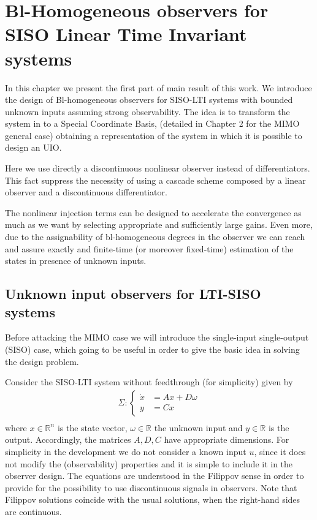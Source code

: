\documentclass[11pt,letterpaper,twoside,openright]{report}
\newcommand{\RE}{\mathbb{R}}
\begin{document}
	\chapter{Bl-Homogeneous observers for SISO Linear Time Invariant systems}
In this chapter we present the first part of main result of this work. We introduce the design of Bl-homogeneous observers for SISO-LTI systems with bounded unknown inputs assuming strong observability. The idea is to transform the system in to a Special Coordinate Basis, (detailed in Chapter 2 for the MIMO general case) obtaining a representation of the system in which it is possible to design an UIO.

Here we use directly a discontinuous nonlinear observer instead of differentiators. This fact suppress the necessity of using a cascade scheme composed by a linear observer and a discontinuous differentiator.

The nonlinear injection terms can be designed to accelerate the convergence as much as we want by selecting appropriate and sufficiently large gains. Even more, due to the assignability of bl-homogeneous degrees in the observer we can reach and assure exactly and finite-time (or moreover fixed-time) estimation of the states in presence of unknown inputs.
	
\section{Unknown input observers for LTI-SISO systems}
Before attacking the MIMO case we will introduce the single-input single-output (SISO) case, which going to be useful in order to give the basic idea in solving the design problem.

Consider the SISO-LTI system without feedthrough (for simplicity) given by
\begin{equation}
	\begin{split}\label{ecu: Sys siso orig}
	\Sigma: \left\{
	\begin{array}{rl}
		\dot{x} &= Ax + D\omega\\
		y&=Cx
	\end{array}
	\right. \\
	\end{split}
\end{equation}
where $x \in \RE^n$ is the state vector, $\omega \in \RE$ the unknown input and $y \in \RE$ is the output. Accordingly, the matrices $A,D,C$ have appropriate dimensions. For simplicity in the development we do not consider a known input $u$, since it does not modify the (observability) properties and it is simple to include it in the observer design. The equations are understood in the Filippov sense \cite{Filipov1988} in order to provide for the possibility to use discontinuous signals in observers. Note that Filippov solutions coincide with the usual solutions, when the right-hand sides are continuous.
\end{document}
